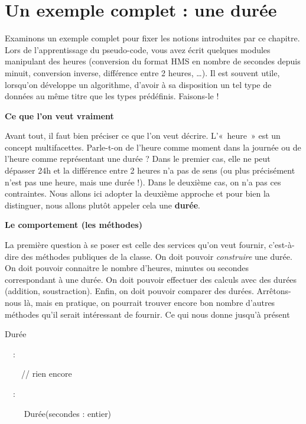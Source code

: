 \bigskip


\bigskip

\section{Un exemple complet : une durée}
{
Examinons un exemple complet pour fixer les notions introduites par ce
chapitre. Lors de l'apprentissage du pseudo-code, vous
avez écrit quelques modules manipulant des heures (conversion du format
HMS en nombre de secondes depuis minuit, conversion inverse, différence
entre 2 heures, …). Il est souvent utile, lorsqu’on développe un
algorithme, d’avoir à sa disposition un tel type de données au même
titre que les types prédéfinis. Faisons-le !}

{\sffamily\bfseries\upshape
Ce que l’on veut vraiment}

{
Avant tout, il faut bien préciser ce que l’on veut décrire. L’«~heure~»
est un concept multifacettes. Parle-t-on de l’heure comme moment dans
la journée ou de l’heure comme représentant une durée ? Dans le premier
cas, elle ne peut dépasser 24h et la différence entre 2 heures n’a pas
de sens (ou plus précisément n’est pas une heure, mais une durée !).
Dans le deuxième cas, on n’a pas ces contraintes. Nous allons ici
adopter la deuxième approche et pour bien la distinguer, nous allons
plutôt appeler cela une \textbf{durée}.}

{\sffamily\bfseries\upshape
Le comportement (les méthodes)}

{
La première question à se poser est celle des services qu’on veut
fournir, c’est-à-dire des méthodes publiques de la classe. On doit
pouvoir \textit{construire} une durée. On doit pouvoir connaitre le
nombre d’heures, minutes ou secondes correspondant à une durée. On doit
pouvoir effectuer des calculs avec des durées (addition, soustraction).
Enfin, on doit pouvoir comparer des durées. Arrêtons-nous là, mais en
pratique, on pourrait trouver encore bon nombre d’autres méthodes qu’il
serait intéressant de fournir. Ce qui nous donne jusqu’à présent}

{\sffamily
{} Durée}

{\sffamily
\ \ :}

{\sffamily
\ \ \ \ // rien encore}

{\sffamily
\ \ :}

{\sffamily
\ \ \ \  Durée(secondes : entier)}


